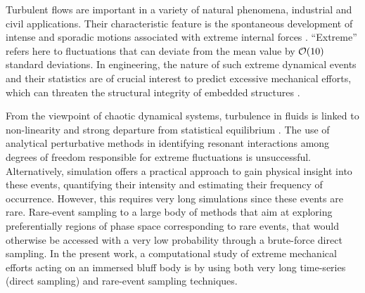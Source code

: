 \documentclass{jfm}
\newcommand{\EL}[1]{{\color{myred}{#1}}}
\begin{document}
%
Turbulent flows are important in a variety of natural phenomena, industrial and civil applications.
Their characteristic feature is the spontaneous development of intense and sporadic motions associated with extreme internal forces \citep{lesieur_book,donzis_sreenivasan_2010,Yeung}.
``Extreme'' refers here to fluctuations that can deviate from the mean value by ${\cal{O}}(10)$ standard deviations.
In engineering, the nature of such extreme dynamical events and their statistics are of crucial interest to predict excessive mechanical efforts, which can threaten the structural integrity of embedded structures \EL{\citep{kanev2010}}.
%

From the viewpoint of chaotic dynamical systems, turbulence in fluids is linked to non-linearity and strong departure from statistical equilibrium \citep{KRAICHNAN}.
The use of analytical perturbative methods in identifying resonant interactions among degrees of freedom responsible for extreme fluctuations is unsuccessful.
Alternatively, simulation offers a practical approach to gain physical insight into these events, quantifying their intensity and estimating their frequency of occurrence.
However, this requires very long simulations since these events are rare.
%
{Rare-event sampling \EL{refers} to a large body of methods that aim at exploring preferentially regions of phase space corresponding to rare events, that would otherwise be accessed with a very low probability through a brute-force direct sampling.}
%
In the present work, a computational study of extreme mechanical efforts acting on an immersed bluff body is \EL{conducted} by using both very long time-series (direct sampling) and rare-event sampling techniques.
%	
\end{document}
